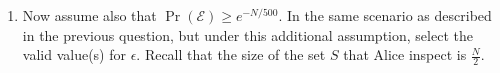 \begin{exercises}
\begin{enumerate}
\item Now assume also that $\Pr(\mathcal{E})\geq e^{-N/500}$. In the same scenario as described in the previous question, but under this additional assumption, select the valid value(s) for $\epsilon$. Recall that the size of the set $S$ that Alice inspect is $\frac{N}{2}$.
\end{enumerate}

\end{exercises}

